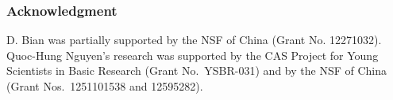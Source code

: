 \documentclass[a4paper,12pt]{amsart} %
\theoremstyle{plain}
\theoremstyle{definition}
\newcommand		{\RR}		{\mathbb R}			%
\renewcommand	{\(}			{\lt(}
\renewcommand	{\)}			{\rt)}
\begin{document}
\subsubsection*{Acknowledgment}
D. Bian was partially supported by the NSF of China (Grant No. 12271032). Quoc-Hung Nguyen's research was supported by the CAS Project for Young
	Scientists in Basic Research (Grant No.~YSBR-031) and by the NSF of China (Grant Nos.~1251101538 and
	12595282). 















\end{document}
